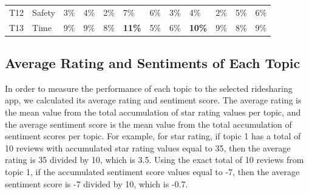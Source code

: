 \documentclass[12pt]{article}
\begin{document}
\begin{table}[!h]
\begin{tabular}{llllllllllll}
T12         & \textcolor[rgb]{0.067,0.067,0.067}{Safety}                                                                                          & 3\%           & 4\%           & 2\%                                                                   & 7\%                                                                & 6\%          & 3\%                                                                   & 4\%                                                                 & 2\%                                                                 & 5\%                                                                 & 6\%                                                                               \\
T13         & \textcolor[rgb]{0.067,0.067,0.067}{Time}                                                                                            & 9\%           & 9\%           & 8\%                                                                   & \textbf{11\%}}                                                               & 5\%          & 6\%                                                                   & \textbf{10\%}}                                                                & 9\%                                                                 & 8\%                                                                 & 9\%  \\
\end{tabular}
\hline
\label{tab:proportion}
\end{table}


\subsection{Average Rating and Sentiments of Each Topic}
In order to measure the performance of each topic to the selected ridesharing app, we calculated its average rating and sentiment score. The average rating is the mean value from the total accumulation of star rating values per topic, and the average sentiment score is the mean value from the total accumulation of sentiment scores per topic. For example, for star rating, if topic 1 has a total of 10 reviews with accumulated star rating values equal to 35, then the average rating is 35 divided by 10, which is 3.5. Using the exact total of 10 reviews from topic 1, if the accumulated sentiment score values equal to -7, then the average sentiment score is -7 divided by 10, which is -0.7.
\end{document}

